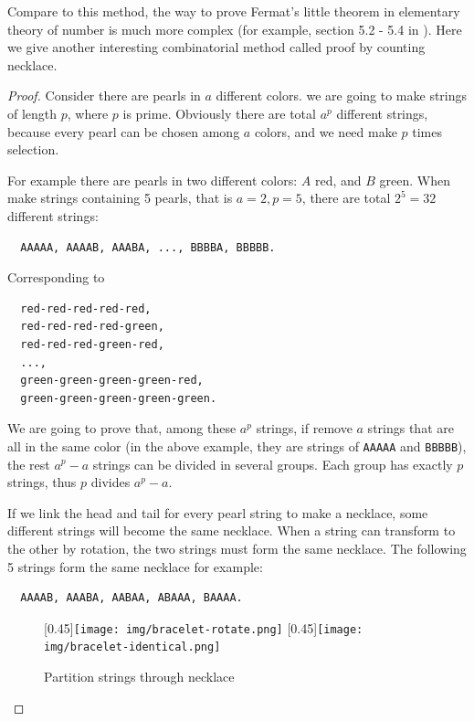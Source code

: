 \documentclass[b5paper]{article}
\begin{document}
Compare to this method, the way to prove Fermat's little theorem in elementary theory of number is much more complex (for example, section 5.2 - 5.4 in \cite{StepanovRose15}). Here we give another interesting combinatorial method called proof by counting necklace\cite{Wiki-FLT-proof}.

\begin{proof}
Consider there are pearls in $a$ different colors. we are going to make strings of length $p$, where $p$ is prime. Obviously there are total $a^p$ different strings, because every pearl can be chosen among $a$ colors, and we need make $p$ times selection.

For example there are pearls in two different colors: $A$ red, and $B$ green. When make strings containing 5 pearls, that is $a = 2, p = 5$, there are total $2^5 = 32$ different strings:

\begin{verbatim}
  AAAAA, AAAAB, AAABA, ..., BBBBA, BBBBB.
\end{verbatim}

Corresponding to

\begin{verbatim}
  red-red-red-red-red,
  red-red-red-red-green,
  red-red-red-green-red,
  ...,
  green-green-green-green-red,
  green-green-green-green-green.
\end{verbatim}

We are going to prove that, among these $a^p$ strings, if remove $a$ strings that are all in the same color (in the above example, they are strings of \texttt{AAAAA} and \texttt{BBBBB}), the rest $a^p - a$ strings can be divided in several groups. Each group has exactly $p$ strings, thus $p$ divides $a^p - a$.

If we link the head and tail for every pearl string to make a necklace, some different strings will become the same necklace. When a string can transform to the other by rotation, the two strings must form the same necklace. The following 5 strings form the same necklace for example:

\begin{verbatim}
  AAAAB, AAABA, AABAA, ABAAA, BAAAA.
\end{verbatim}

\begin{figure}[htbp]
  \centering
  [0.45\linewidth]{\texttt{[image: img/bracelet-rotate.png]}} \quad
  [0.45\linewidth]{\texttt{[image: img/bracelet-identical.png]}}
  \caption{Partition strings through necklace}
  \label{fig:bracelet}
\end{figure}


\end{proof}
\end{document}
